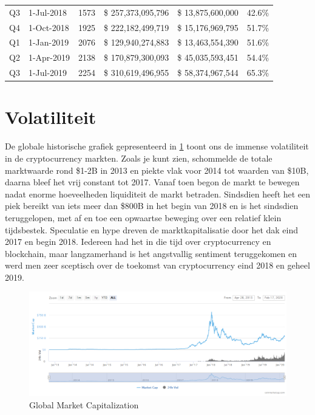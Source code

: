 \begin{table}[ht]
\begin{tabular}{@{}lllllr@{}}
Q3       & 1-Jul-2018     & 1573          & \$     257,373,095,796    & \$        13,875,600,000      & 42.6\% \\
Q4       & 1-Oct-2018     & 1925          & \$     222,182,499,719    & \$        15,176,969,795      & 51.7\% \\
Q1       & 1-Jan-2019     & 2076          & \$     129,940,274,883    & \$        13,463,554,390      & 51.6\% \\
Q2       & 1-Apr-2019     & 2138          & \$     170,879,300,093    & \$          45,035,593,451    & 54.4\%  \\
Q3       & 1-Jul-2019     & 2254          & \$     310,619,496,955    & \$           58,374,967,544   & 65.3\%  \\

\bottomrule
\end{tabular}
\label{tab:historicalmarketcap}
\end{table}

\section{Volatiliteit}
De globale historische grafiek gepresenteerd in \cref{fig:totalmarketcap} toont ons de immense volatiliteit in de cryptocurrency markten.  Zoals je kunt zien, schommelde de totale marktwaarde rond \$1-2B in 2013 en piekte vlak voor 2014 tot waarden van \$10B, daarna bleef het vrij constant tot 2017.  Vanaf toen begon de markt te bewegen nadat enorme hoeveelheden liquiditeit de markt betraden. Sindsdien heeft het een piek bereikt van iets meer dan \$800B in het begin van 2018 en is het sindsdien teruggelopen, met af en toe een opwaartse beweging over een relatief klein tijdsbestek. Speculatie en hype dreven de marktkapitalisatie door het dak eind 2017 en begin 2018. Iedereen had het in die tijd over cryptocurrency en blockchain, maar langzamerhand is het angstvallig sentiment teruggekomen en werd men zeer sceptisch over de toekomst van cryptocurrency eind 2018 en geheel 2019.
 
\begin{figure}[htb]
    \centering
    \includegraphics[width=.95\textwidth]{img/ch-iceage/cmc_mcapchart_feb2020.PNG}
    \caption{Global Market Capitalization}
    \label{fig:totalmarketcap}
\end{figure} 

